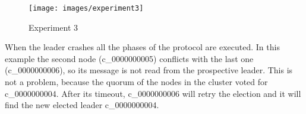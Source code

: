 \begin{figure}[H]
    \centering
    \texttt{[image: images/experiment3]}
    \caption{Experiment 3}
    \label{fig:experiment3}
\end{figure}

When the leader crashes all the phases of the protocol are executed.
In this example the second node (c\_0000000005) conflicts with the last one (c\_0000000006), so its message is not read from the prospective leader.
This is not a problem, because the quorum of the nodes in the cluster voted for c\_0000000004.
After its timeout, c\_0000000006 will retry the election and it will find the new elected leader c\_0000000004.